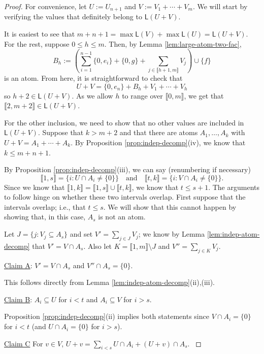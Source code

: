 \documentclass{report}
\newcommand{\llb}{\llbracket}
\newcommand{\rrb}{\rrbracket}
\renewcommand{\:}{\text{:}}
\theoremstyle{definition}
\begin{document}
\begin{proof}
For convenience, let $U := U_{n+1}$ and $V := V_1 + \cdots + V_m$.
We will start by verifying the values that definitely belong to $\mathsf{L}(U+V)$.

It is easiest to see that $m+n+1 =\max\mathsf{L}(V)+\max\mathsf{L}(U) = \mathsf{L}(U+V)$.
For the rest, suppose $0\le h \le m$.
Then, by Lemma \ref{lem:large-atom-two-fac}, 
\[B_h := \left( \sum_{i=1}^{n-1} \{0,e_i\} + \{0,g\} + \sum_{j\in \llb h+1,m \rrb} V_j \right) \cup \{f\} \]
is an atom.
From here, it is straightforward to check that
\[ U+ V = \{0,e_n\} + B_h + V_1 + \cdots + V_h \]
so $h+2 \in \mathsf{L}(U+V)$.
As we allow $h$ to range over $\llb 0,m \rrb$, we get that $\llb 2,m+2 \rrb \in \mathsf{L}(U+V)$.

For the other inclusion, we need to show that no other values are included in $\mathsf{L}(U+V)$.
Suppose that $k > m+2$ and that there are atoms $A_1,\dots,A_k$ with $U+V = A_1 + \cdots + A_k$.
By Proposition \ref{prop:indep-decomp}(iv), we know that $k \le m+n+1$.

By Proposition \ref{prop:indep-decomp}(iii), we can say (renumbering if necessary)
\[ \llb 1,s \rrb =  \{ i: U\cap A_i \neq\{0\}\} \quad \textrm{and} \quad \llb t,k \rrb = \{i: V\cap A_i \neq \{0\}\}. \]
Since we know that $\llb 1,k \rrb = \llb 1,s \rrb \cup \llb t,k \rrb$, we know that $t \le s+1$.
The arguments to follow hinge on whether these two intervals overlap.  
First suppose that the intervals overlap; i.e., that $t \le s$.
We will show that this cannot happen by showing that, in this case, $A_s$ is not an atom.

Let $J = \{ j: V_j \subseteq A_s \}$ and set $V' = \sum_{j\in J} V_j$; we know by Lemma \ref{lem:indep-atom-decomp} that $V' = V \cap A_s$.
Also let $K = \llb 1,m \rrb \setminus J$ and $V'' = \sum_{j\in K} V_j$.

\noindent\underline{Claim A}: $V' = V\cap A_s$ and $V'' \cap A_s = \{0\}$. \label{cla}

This follows directly from Lemma \ref{lem:indep-atom-decomp}(ii),(iii).

\noindent\underline{Claim B}: $A_i \subseteq U$ for $i<t$ and $A_i \subseteq V$ for $i > s$. \label{clb}

Proposition \ref{prop:indep-decomp}(ii) implies both statements since $V \cap A_i = \{0\}$ for $i<t$ (and $U\cap A_i = \{0\}$ for $i>s$).

\noindent\underline{Claim C} For $v\in V$, $U+v = \sum\limits_{i<s} U\cap A_i + (U+v)\cap A_s$. \label{clc}


\end{proof}
\end{document}
